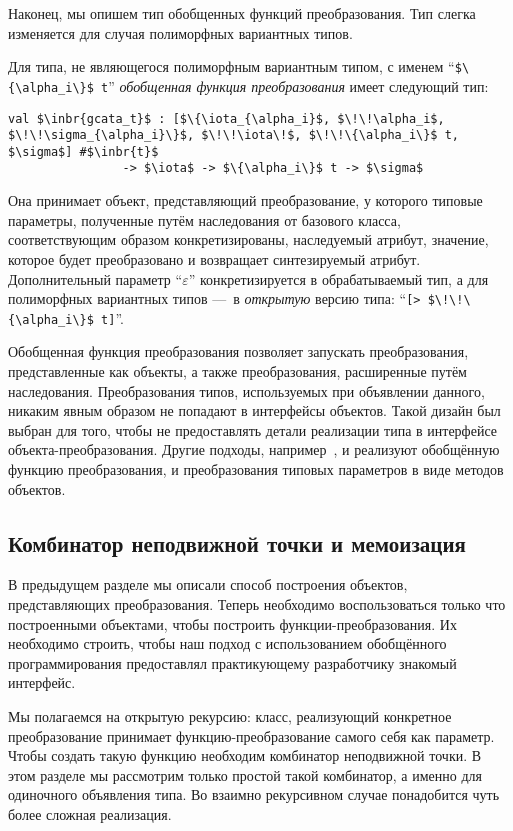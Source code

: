 Наконец, мы опишем тип обобщенных функций преобразования. Тип слегка изменяется для случая полиморфных вариантных типов.

Для типа, не являющегося полиморфным вариантным типом, с именем ``\lstinline|$\{\alpha_i\}$ t|'' \emph{обобщенная функция преобразования} имеет следующий тип:

\begin{lstlisting}
val $\inbr{gcata_t}$ : [$\{\iota_{\alpha_i}$, $\!\!\alpha_i$, $\!\!\sigma_{\alpha_i}\}$, $\!\!\iota\!$, $\!\!\{\alpha_i\}$ t, $\sigma$] #$\inbr{t}$ 
                -> $\iota$ -> $\{\alpha_i\}$ t -> $\sigma$
\end{lstlisting}

Она принимает объект, представляющий преобразование, у которого типовые параметры, полученные путём наследования от базового класса, соответствующим образом конкретизированы, наследуемый атрибут, значение, которое будет преобразовано и возвращает синтезируемый атрибут.
Дополнительный параметр ``$\varepsilon$'' конкретизируется в обрабатываемый тип, а 
для полиморфных вариантных типов ---~в \emph{открытую}
версию типа:  ``\lstinline|[> $\!\!\{\alpha_i\}$ t]|''. 

Обобщенная функция преобразования позволяет запускать   преобразования, представленные как объекты, а также преобразования, расширенные путём наследования. Преобразования типов, используемых при объявлении данного, никаким явным образом не попадают в интерфейсы объектов. Такой дизайн был выбран для того, чтобы не предоставлять детали реализации типа в интерфейсе объекта-преобразования. Другие подходы, например~\cite{Visitors}, и реализуют обобщённую функцию преобразования, и преобразования типовых параметров в виде методов объектов.


\subsection{Комбинатор неподвижной точки и мемоизация}
\label{memofix}

В предыдущем разделе мы описали способ построения объектов, представляющих преобразования. Теперь необходимо воспользоваться только что построенными объектами, чтобы построить функции-преобразования. Их необходимо строить, чтобы наш подход с использованием обобщённого программирования предоставлял практикующему разработчику знакомый интерфейс.

Мы полагаемся  на открытую рекурсию: класс, реализующий конкретное преобразование принимает функцию-преобразование самого себя как параметр.
Чтобы создать такую функцию необходим комбинатор неподвижной точки. В  этом разделе
мы рассмотрим только простой такой комбинатор, а именно для одиночного объявления типа.
Во взаимно рекурсивном случае понадобится чуть более сложная реализация. %

